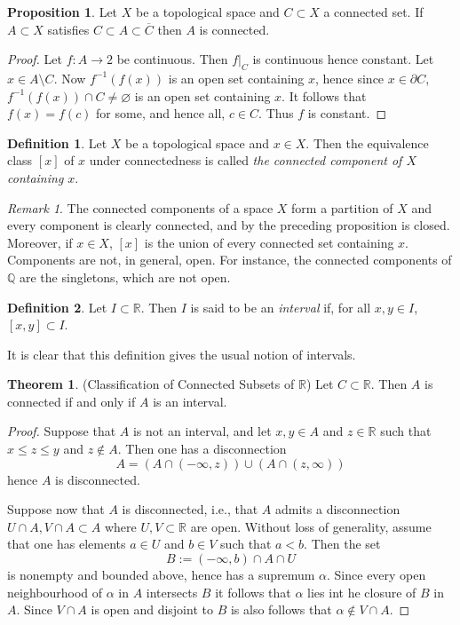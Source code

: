 \documentclass{book}
\theoremstyle{definition}
\newtheorem{theorem}{Theorem}[section]
\newtheorem{proposition}{Proposition}[section]
\newtheorem{definition}{Definition}[section]
\theoremstyle{remark}
\newtheorem{remark}{Remark}[section]
\newcommand{\R}{\mathbb{R}}
\newcommand{\Q}{\mathbb{Q}}
\begin{document}
\begin{proposition}
Let $X$ be a topological space and $C\subset X$ a connected set. If $A\subset X$ satisfies $C\subset A\subset \overline C$ then $A$ is connected.
\end{proposition}
\begin{proof}
Let $f:A\to 2$ be continuous. Then $f|_C$ is continuous hence constant. Let $x\in A\setminus C$. Now $f^{-1}(f(x))$ is an open set containing $x$, hence since $x\in\partial C$, $f^{-1}(f(x))\cap C\neq\varnothing$ is an open set containing $x$. It follows that $f(x)=f(c)$ for some, and hence all, $c\in C$. Thus $f$ is constant.
\end{proof}

\begin{definition}
Let $X$ be a topological space and $x\in X$. Then the equivalence class $[x]$ of $x$ under connectedness is called \textit{the connected component of $X$ containing $x$}. 
\end{definition}

\begin{remark}
The connected components of a space $X$ form a partition of $X$ and every component is clearly connected, and by the preceding proposition is closed. Moreover, if $x\in X$, $[x]$ is the union of every connected set containing $x$. Components are not, in general, open. For instance, the connected components of $\Q$ are the singletons, which are not open.
\end{remark}

\begin{definition}
Let $I\subset\R$. Then $I$ is said to be an \textit{interval} if, for all $x,y\in I$, $[x,y]\subset I$.
\end{definition}

It is clear that this definition gives the usual notion of intervals.

\begin{theorem}(Classification of Connected Subsets of $\R$)\newline
Let $C\subset\R$. Then $A$ is connected if and only if $A$ is an interval.
\end{theorem}
\begin{proof}
Suppose that $A$ is not an interval, and let $x,y\in A$ and $z\in\R$ such that $x\leq z\leq y$ and $z\notin A$. Then one has a disconnection
$$A=(A\cap(-\infty,z))\cup(A\cap(z,\infty))$$
hence $A$ is disconnected.

Suppose now that $A$ is disconnected, i.e., that $A$ admits a disconnection $U\cap A,V\cap A\subset A$ where $U,V\subset\R$ are open. Without loss of generality, assume that one has elements $a\in U$ and $b\in V$ such that $a<b$. Then the set
$$B:=(-\infty,b)\cap A\cap U$$
is nonempty and bounded above, hence has a supremum $\alpha$. Since every open neighbourhood of $\alpha$ in $A$ intersects $B$ it follows that $\alpha$ lies int he closure of $B$ in $A$. Since $V\cap A$ is open and disjoint to $B$ is also follows that $\alpha\notin V\cap A$.
\end{proof}
\end{document}
